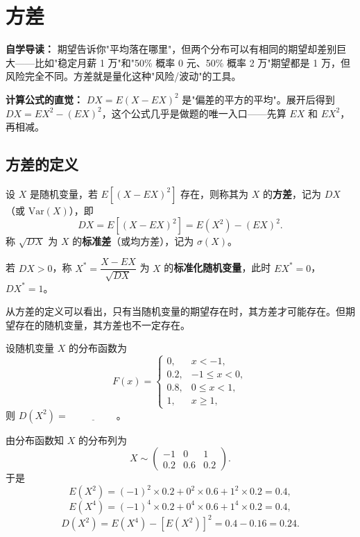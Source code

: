 ﻿\documentclass[lang=cn,11pt]{elegantbook}
\begin{document}
\section{方差}

\begin{note}
\textbf{自学导读：} 期望告诉你"平均落在哪里"，但两个分布可以有相同的期望却差别巨大——比如"稳定月薪 1 万"和"50\% 概率 0 元、50\% 概率 2 万"期望都是 1 万，但风险完全不同。方差就是量化这种"风险/波动"的工具。

\textbf{计算公式的直觉：} $DX = E(X-EX)^2$ 是"偏差的平方的平均"。展开后得到 $DX = EX^2 - (EX)^2$，这个公式几乎是做题的唯一入口——先算 $EX$ 和 $EX^2$，再相减。
\end{note}

\subsection{方差的定义}

\begin{definition}[方差] \label{def:variance}
设 \(X\) 是随机变量，若 \(E[(X - EX)^2]\) 存在，则称其为 \(X\) 的\textbf{方差}，记为 \(DX\)（或 \(\mathrm{Var}(X)\)），即
\[
DX = E[(X - EX)^2] = E(X^2) - (EX)^2.
\]
称 \(\sqrt{DX}\) 为 \(X\) 的\textbf{标准差}（或均方差），记为 \(\sigma(X)\)。

若 \(DX > 0\)，称 \(X^* = \dfrac{X - EX}{\sqrt{DX}}\) 为 \(X\) 的\textbf{标准化随机变量}，此时 \(EX^* = 0\)，\(DX^* = 1\)。
\end{definition}

\begin{note}
从方差的定义可以看出，只有当随机变量的期望存在时，其方差才可能存在。但期望存在的随机变量，其方差也不一定存在。
\end{note}



\begin{exercise}\label{exer:4-s5-dx2}
设随机变量 \(X\) 的分布函数为
\[
F(x) = \begin{cases} 0, & x < -1, \\ 0.2, & -1 \leqslant x < 0, \\ 0.8, & 0 \leqslant x < 1, \\ 1, & x \geqslant 1, \end{cases}
\]
则 \(D(X^2) =\,\underline{\hspace{2cm}}\)。
\end{exercise}

\begin{solution}
由分布函数知 \(X\) 的分布列为
\[
X \sim \begin{pmatrix} -1 & 0 & 1 \\ 0.2 & 0.6 & 0.2 \end{pmatrix}.
\]
于是
\[
E(X^2) = (-1)^2 \times 0.2 + 0^2 \times 0.6 + 1^2 \times 0.2 = 0.4,
\]
\[
E(X^4) = (-1)^4 \times 0.2 + 0^4 \times 0.6 + 1^4 \times 0.2 = 0.4,
\]
\[
D(X^2) = E(X^4) - [E(X^2)]^2 = 0.4 - 0.16 = 0.24.
\]
\end{solution}
\end{document}
